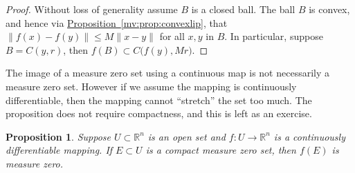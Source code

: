 \documentclass[12pt]{book}
\newcommand{\snorm}[1]{\lVert {#1} \rVert}
\newcommand{\R}{{\mathbb{R}}}
\theoremstyle{plain}
\newtheorem{prop}[thm]{Proposition}
\theoremstyle{remark}
\theoremstyle{definition}
\theoremstyle{exercise}
\theoremstyle{example}
\newcommand{\propref}[1]{\hyperref[#1]{Proposition~\ref*{#1}}}
\begin{document}
\begin{proof}
Without loss of generality assume $B$ is a closed ball.
The ball $B$ is convex, and hence via
\propref{mv:prop:convexlip},
that $\snorm{f(x)-f(y)} \leq M \snorm{x-y}$
for all $x,y$ in $B$.  In particular, suppose $B = C(y,r)$,
then $f(B) \subset C\bigl(f(y),M r \bigr)$.
\end{proof}

The image of a measure zero set using a continuous map is not necessarily
a measure zero set.  However if we assume the mapping is continuously
differentiable, then the mapping cannot ``stretch'' the set too much.
The proposition does not require compactness, and this is left as an
exercise.

\begin{prop} \label{prop:imagenull}
Suppose $U \subset \R^n$ is an open set and $f \colon U \to \R^n$
is a continuously differentiable mapping.  If $E \subset U$ is a 
compact measure zero set, then $f(E)$ is measure zero.
\end{prop}
\end{document}
